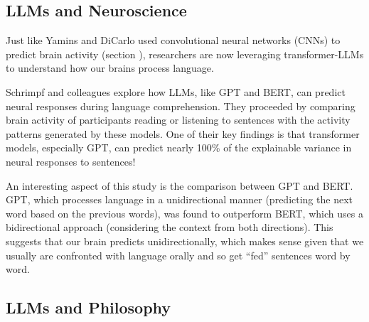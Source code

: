 \subsection{LLMs and Neuroscience}

Just like Yamins and DiCarlo used convolutional neural networks (CNNs) to predict brain activity (section ), researchers are now leveraging transformer-LLMs to understand how our brains process language. 

Schrimpf and colleagues \cite{schrimpf2021neural} explore how LLMs, like GPT and BERT, can predict neural responses during language comprehension. They proceeded by comparing  brain activity of participants reading or listening to sentences with the activity patterns generated by these models. One of their key findings is that transformer models, especially GPT, can predict nearly 100\% of the explainable variance in neural responses to sentences! 

An interesting aspect of this study is the comparison between GPT and BERT. GPT, which processes language in a unidirectional manner (predicting the next word based on the previous words), was found to outperform BERT, which uses a bidirectional approach (considering the context from both directions). This suggests that our brain predicts unidirectionally, which  makes sense given that we usually are confronted with language orally and so get ``fed'' sentences word by word. 


\subsection{LLMs and Philosophy}\label{llmPhilosophy}

